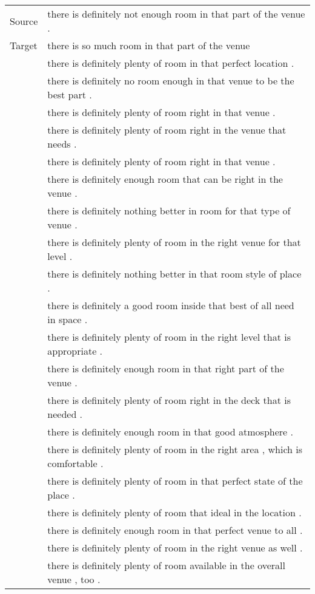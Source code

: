 \documentclass[11pt]{article}
\begin{document}
\begin{table}[ht]
\centering
    \footnotesize
    \vspace{-19pt}
    \begin{tabular}{l|l}
    \toprule
Source&there is definitely not enough room in that part of the venue .\\
Target&there is so much room in that part of the venue\\\midrule
&there is definitely plenty of room in that perfect location .\\
&there is definitely no room enough in that venue to be the best part .\\
&there is definitely plenty of room right in that venue .\\
&there is definitely plenty of room right in the venue that needs .\\
&there is definitely plenty of room right in that venue .\\
&there is definitely enough room that can be right in the venue .\\
&there is definitely nothing better in room for that type of venue .\\
&there is definitely plenty of room in the right venue for that level .\\
&there is definitely nothing better in that room style of place .\\
&there is definitely a good room inside that best of all need in space .\\
&there is definitely plenty of room in the right level that is appropriate .\\
&there is definitely enough room in that right part of the venue .\\
&there is definitely plenty of room right in the deck that is needed .\\
&there is definitely enough room in that good atmosphere .\\
&there is definitely plenty of room in the right area , which is comfortable .\\
&there is definitely plenty of room in that perfect state of the place .\\
&there is definitely plenty of room that ideal in the location .\\
&there is definitely enough room in that perfect venue to all .\\
&there is definitely plenty of room in the right venue as well .\\
&there is definitely plenty of room available in the overall venue , too .\\

\end{tabular}
\end{table}
\end{document}
